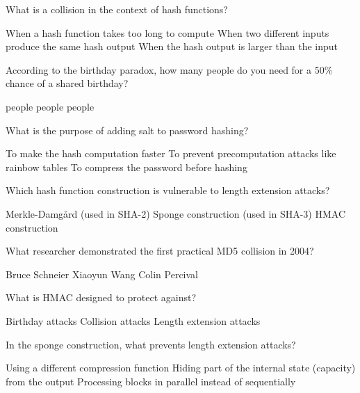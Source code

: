 \documentclass[10pt,a4paper,american]{exam}
\begin{document}
\begin{questions}
	\question What is a collision in the context of hash functions?
	\begin{randomizechoices}
		\choice When a hash function takes too long to compute
		\CorrectChoice When two different inputs produce the same hash output
		\choice When the hash output is larger than the input
	\end{randomizechoices}

	\question According to the birthday paradox, how many people do you need for a 50\% chance of a shared birthday?
	\begin{randomizechoices}
		 people
		 people
		 people
	\end{randomizechoices}

	\question What is the purpose of adding salt to password hashing?
	\begin{randomizechoices}
		\choice To make the hash computation faster
		\CorrectChoice To prevent precomputation attacks like rainbow tables
		\choice To compress the password before hashing
	\end{randomizechoices}

	\question Which hash function construction is vulnerable to length extension attacks?
	\begin{randomizechoices}
		\CorrectChoice Merkle-Damgård (used in SHA-2)
		\choice Sponge construction (used in SHA-3)
		\choice HMAC construction
	\end{randomizechoices}

	\question What researcher demonstrated the first practical MD5 collision in 2004?
	\begin{randomizechoices}
		\choice Bruce Schneier
		\CorrectChoice Xiaoyun Wang
		\choice Colin Percival
	\end{randomizechoices}

	\question What is HMAC designed to protect against?
	\begin{randomizechoices}
		\choice Birthday attacks
		\choice Collision attacks
		\CorrectChoice Length extension attacks
	\end{randomizechoices}

	\question In the sponge construction, what prevents length extension attacks?
	\begin{randomizechoices}
		\choice Using a different compression function
		\CorrectChoice Hiding part of the internal state (capacity) from the output
		\choice Processing blocks in parallel instead of sequentially
	\end{randomizechoices}


\end{questions}
\end{document}
